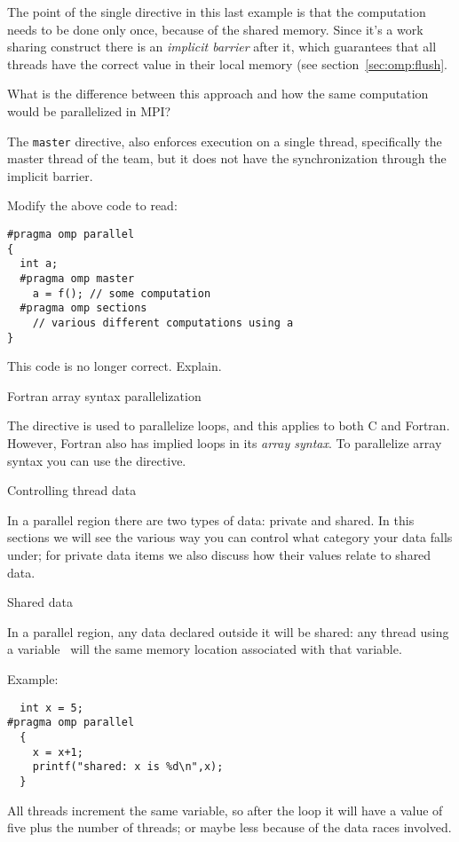 The point of the single directive in this last example is that the
computation needs to be done only once, because of the shared memory.
Since it's a work sharing construct there is an \emph{implicit
  barrier} after it,
which guarantees that all threads have the correct value in their
local memory (see section~\ref{sec:omp:flush}.

\begin{exercise}
  What is the difference between this approach and how the same
  computation would be parallelized in MPI?
\end{exercise}

The \texttt{master} directive, also enforces execution
on a single thread, specifically the master thread of the team,
but it does not have the synchronization through the implicit barrier.

\begin{exercise}
  Modify the above code to read:
\begin{verbatim}
#pragma omp parallel
{
  int a;
  #pragma omp master
    a = f(); // some computation
  #pragma omp sections
    // various different computations using a
}
\end{verbatim}
  This code is no longer correct. Explain.
\end{exercise}

 {Fortran array syntax parallelization}

The  directive is used to parallelize loops,
and this applies to both C and Fortran. However, Fortran also
has implied loops in its \emph{array syntax}.
To parallelize array syntax you can use the 
directive.

 {Controlling thread data}

In a parallel region there are two types of data: private and shared.
In this sections we will see the various way you can control what category
your data falls under; for private data items we also discuss how their values
relate to shared data.

 {Shared data}

In a parallel region, any data declared outside it will be shared:
any thread using a variable~ will  the same memory location
associated with that variable.

Example:
\begin{verbatim}
  int x = 5;
#pragma omp parallel
  {
    x = x+1;
    printf("shared: x is %d\n",x);
  }
\end{verbatim}
All threads increment the same variable, so after the loop it will
have a value of five plus the number of threads; or maybe less because of the data races
involved.

